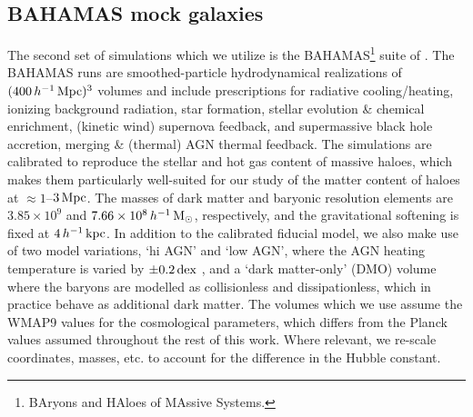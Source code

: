 \documentclass[usenatbib]{mnras}
\begin{document}


\subsection{BAHAMAS mock galaxies}
\label{sec:bahamas_mocks}
The second set of simulations which we utilize is the BAHAMAS\footnote{BAryons and HAloes of MAssive Systems.} suite of \citet{mccarthy2017}. The BAHAMAS runs are smoothed-particle hydrodynamical realizations of $(400\,h^{-1}\,{\rm Mpc})^3$ volumes and include prescriptions for radiative cooling/heating, ionizing background radiation, star formation, stellar evolution \& chemical enrichment, (kinetic wind) supernova feedback, and supermassive black hole accretion, merging \& (thermal) AGN thermal feedback. The simulations are calibrated to reproduce the stellar and hot gas content of massive haloes, which makes them particularly well-suited for our study of the matter content of haloes at $\approx 1$--$3\,{\rm Mpc}$. The masses of dark matter and baryonic resolution elements are $3.85\times 10^9$ and $7.66\times 10^8\,h^{-1}\,{\rm M}_\odot$, respectively, and the gravitational softening is fixed at $4\,h^{-1}\,{\rm kpc}$. In addition to the calibrated fiducial model, we also make use of two model variations, `hi AGN' and `low AGN', where the AGN heating temperature is varied by $\pm0.2\,{\rm dex}$ \citep{mccarthy2018}, and a `dark matter-only' (DMO) volume where the baryons are modelled as collisionless and dissipationless, which in practice behave as additional dark matter. The volumes which we use assume the WMAP9 values for the cosmological parameters, which differs from the Planck values assumed throughout the rest of this work. Where relevant, we re-scale coordinates, masses, etc. to account for the difference in the Hubble constant.
\end{document}
